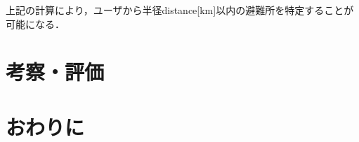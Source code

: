 \documentclass[technicalreport,dvipdfmx]{ieicej}
\begin{document}
上記の計算により，ユーザから半径distance[km]以内の避難所を特定することが可能になる．



\subsection{}

\section{考察・評価}

\section{おわりに}


%
%
\begin{thebibliography}{99}%
\bibitem{}
\end{thebibliography}
\end{document}

